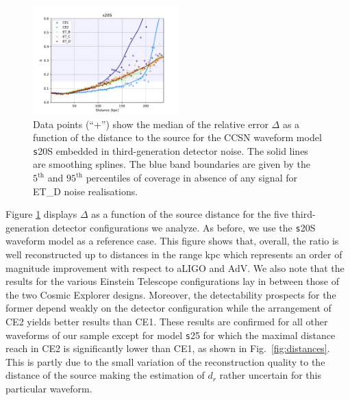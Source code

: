 \begin{figure}[t]
  \centering
  \includegraphics[width=0.5\textwidth]{plots/s20--SFHo_all3G}
  \caption{Data points (``+'') show the median of the relative error $\Delta$ as a function of the  distance to the source for the CCSN waveform model {\texttt s20S} embedded in third-generation detector noise. The solid lines are smoothing splines. The blue band boundaries are given by the $\mathrm{5^{th}}$ and $\mathrm{95^{th}}$ percentiles of coverage in absence of any signal for ET\_D noise realisations.}
  \label{fig:s20--SFHo_all3G}
\end{figure}

Figure \ref{fig:s20--SFHo_all3G} displays $\Delta$ as a function of the source distance for the five third-generation detector configurations we analyze. As before, we use the {\texttt s20S} waveform model as a reference case.  This figure shows that,  overall, the ratio is well reconstructed up to distances in the range \unit[100--200]{kpc} which represents an order of magnitude improvement with respect to aLIGO and AdV. We also note that the results for the various Einstein Telescope configurations lay in between those of the two Cosmic Explorer designs. Moreover,  the detectability prospects for the former depend weakly on the detector configuration while the arrangement of CE2 yields better results than CE1. These results are confirmed for all other waveforms of our sample except for model {\texttt s25} for which the maximal distance reach in CE2 is significantly lower than CE1, as shown in Fig.~\ref{fig:distances}. This is partly due to the small variation of the reconstruction quality to the distance of the source making the estimation of $d_r$ rather uncertain for this particular waveform. %

